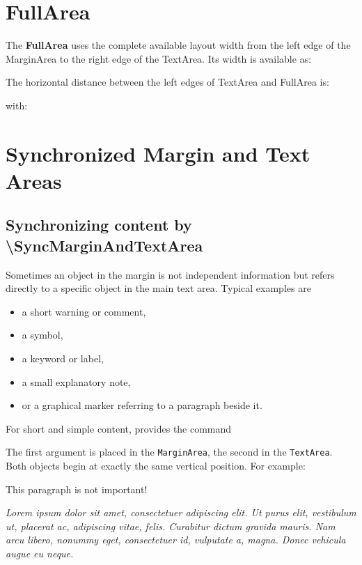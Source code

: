 \documentclass[
11pt,
a4paper,
oneside
]{scrbook}
\begin{document}
\section{FullArea}
\begin{FullArea}
The \textbf{FullArea} uses the complete available layout width from the left
edge of the MarginArea to the right edge of the TextArea.
Its width is available as:




The horizontal distance between the left edges of TextArea and FullArea is:




with:




\end{FullArea}

\section{Synchronized Margin and Text Areas}
\subsection{Synchronizing content by \textbackslash SyncMarginAndTextArea}

Sometimes an object in the margin is not independent information but
refers directly to a specific object in the main text area.
Typical examples are
\begin{itemize}
	\item a short warning or comment,
	\item a symbol,
	\item a keyword or label,
	\item a small explanatory note,
	\item or a graphical marker referring to a paragraph beside it.
\end{itemize}
For short and simple content, \MDWordmark provides the command




The first argument is placed in the \texttt{MarginArea}, the second
in the \texttt{TextArea}. Both objects begin at exactly the same
vertical position.
For example:




\begin{SynchronizedMarginAndTextArea}
\begin{TextInMarginArea}
This paragraph is not important!
\end{TextInMarginArea}
\begin{TextInTextArea}
\emph{Lorem ipsum dolor sit amet, consectetuer adipiscing elit. Ut purus elit, vestibulum ut, placerat ac, adipiscing vitae, felis. Curabitur dictum gravida mauris. Nam arcu libero, nonummy eget, consectetuer id, vulputate a, magna. Donec vehicula augue eu neque.}
\end{TextInTextArea}
\end{SynchronizedMarginAndTextArea}
\end{document}
